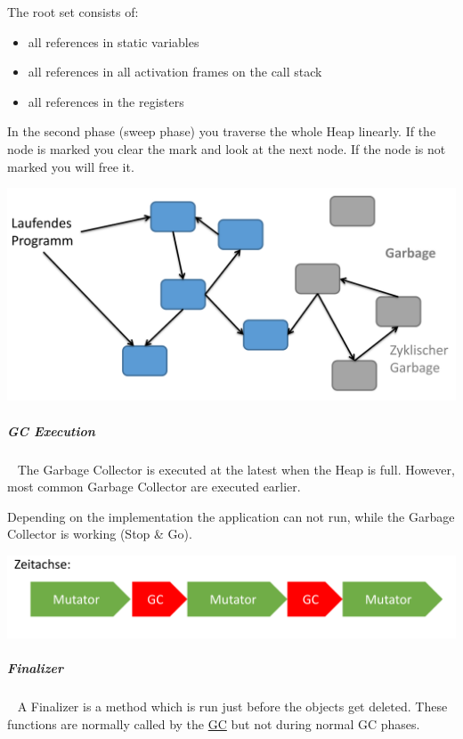 \documentclass[11pt,twoside,landscape]{article}
\begin{document}
\begin{multicols}{3}
The root set consists of:
\begin{itemize}
\item all references in static variables
\item all references in all activation frames on the call stack
\item all references in the registers
\end{itemize}

In the second phase (sweep phase) you traverse the whole Heap linearly.
If the node is marked you clear the mark and look at the next node.
If the node is not marked you will free it.


{
\begin{center}
\includegraphics[width=.9\linewidth]{img/heap_graph.png}
\end{center}
\label{fig:heap-graph-of-nodes}
}

\subparagraph{GC Execution} \
\label{sec:orgaf8e3fc}
The Garbage Collector is executed at the latest when the Heap is full.
However, most common Garbage Collector are executed earlier.

Depending on the implementation the application can not run, while the Garbage Collector is working (Stop \& Go).


{
\begin{center}
\includegraphics[width=.9\linewidth]{img/stop_and_go_gc.png}
\end{center}
\label{fig:stop-go-gc}
}

\subparagraph{Finalizer} \
\label{sec:org2e848c4}
A Finalizer is a method which is run just before the objects get deleted.
These functions are normally called by the \href{../../../roam/20211008083744-garbage_collection.org}{GC} but not during normal GC phases.


\end{multicols}
\end{document}
